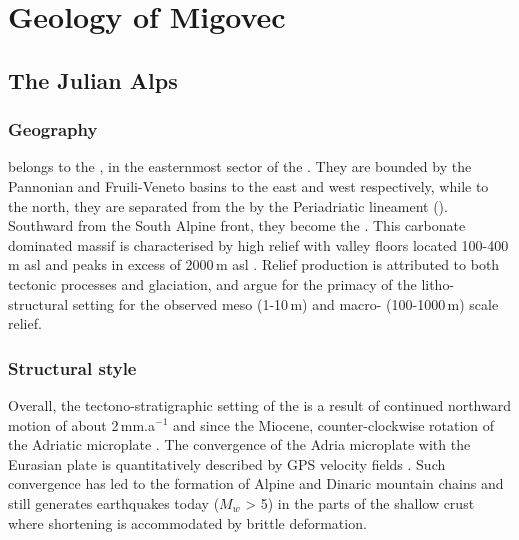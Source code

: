 \chapter{Geology of Migovec}

\section{The Julian Alps}
\label{sec:The Julian Alps}

\subsection{Geography} 
\label{par:Geography} 
 belongs to the , in the easternmost sector of the  \citep{bavec2004late}. 
They  are bounded by the Pannonian and  Fruili-Veneto basins to the east and west respectively, while to the north, they are separated from the  by the Periadriatic lineament (). Southward from the South Alpine front, they become the  \citep{placer1998contribution,burrato2008sources}.
This carbonate dominated massif is characterised by high relief with valley floors located 100-400\,m asl and peaks in excess of 2000\,m asl  \citep{vsmuc2009tectonic}. Relief production is attributed to both tectonic processes and glaciation, and \citet{vsmuc2009tectonic} argue for the primacy of the litho-structural setting for the observed meso (1-10\,m) and macro- (100-1000\,m) scale relief.


\subsection{Structural style}
\label{par:Structural style}
Overall, the tectono-stratigraphic setting  of the  is a result of continued northward motion of about 2\,mm.a$^{-1}$ \citep{burrato2008sources} and since the Miocene,  counter-clockwise rotation of the Adriatic microplate \citep{marton2003palaeomagnetic}. 
The convergence of the Adria microplate with the Eurasian plate is quantitatively described by GPS velocity fields \citep{grenerczy2005tectonic}. 
Such convergence has led to the formation of Alpine and Dinaric mountain chains and still generates earthquakes today ($M_w$ > 5) in the parts of the shallow crust where shortening is accommodated by brittle deformation.

